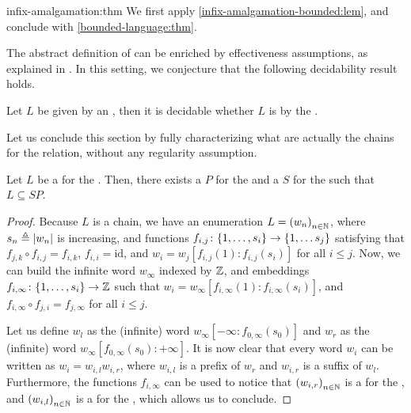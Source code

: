 \begin{proofof}{infix-amalgamation:thm}
    We first apply \cref{infix-amalgamation-bounded:lem},
    and conclude with \cref{bounded-language:thm}.
\end{proofof}

The abstract definition of  can be enriched by
effectiveness assumptions, as explained in \cite[Section 3.1.4]{ASZZ24}. In
this setting, we conjecture that the following decidability result holds.

\begin{conjecture}
    Let $L$ be given by an ,
    then it is decidable whether $L$ 
    is  by the .
\end{conjecture}


Let us conclude this section by fully characterizing what are
actually the chains for the  relation, without any 
regularity assumption.

\begin{lemma}
    \label{chains-infix:lem}
    Let $L$ be a  for the . Then, there exists
    a  $P$ for the  and a 
    $S$ for the  such that $L \subseteq SP$.
\end{lemma}
\begin{proof}
    Because $L$ is a chain,
    we have an enumeration $L = \seqof{w_n}$,
    where $s_n \triangleq \left| w_n \right|$ is increasing, 
    and functions
    $f_{i,j} \colon \{ 1, \dots, s_i \} \to \{ 1, \dots s_{j} \}$
    satisfying
    that $f_{j,k} \circ f_{i, j} = f_{i, k}$,
    $f_{i,i} = \mathrm{id}$, and
    $w_i = w_j[f_{i,j}(1):f_{i,j}(s_i)]$ for all $i \leq j$.
    Now, we can build the infinite word $w_\infty$ indexed by $\mathbb{Z}$, and
    embeddings $f_{i, \infty} \colon \{ 1, \dots, s_i \} \to \mathbb{Z}$ such that
    $w_i = w_\infty[f_{i, \infty}(1):f_{i, \infty}(s_i)]$, and $f_{i, \infty}
    \circ f_{j, i} = f_{j, \infty}$ for all $i \leq j$.

    Let us define $w_l$ as the (infinite) word $w_\infty[-\infty: f_{0,
    \infty}(s_0)]$ and $w_r$ as the (infinite) word $w_\infty[f_{0,
    \infty}(s_0): +\infty]$. It is now clear that every word $w_i$ can be
    written as $w_i = w_{i,l} w_{i,r}$, where $w_{i,l}$ is a prefix of $w_r$
    and $w_{i,r}$ is a suffix of $w_l$. Furthermore, the functions $f_{i,
    \infty}$ can be used to notice that $\seqof{w_{i,r}}$ is a  for
    the , and $\seqof{w_{i,l}}$ is a  for the
    , which allows us to conclude.
\end{proof}



